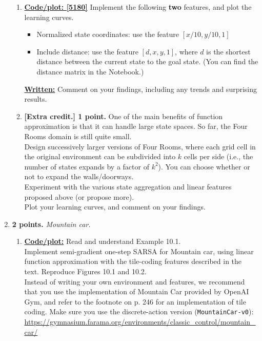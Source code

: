 \documentclass{article}
\begin{document}
\begin{enumerate}
\begin{enumerate}[resume]
\item \uline{\textbf{Code/plot: [5180]}} Implement the following \textbf{two} features, and plot the learning curves. \\
\begin{itemize}
    \item Normalized state coordinates: use the feature $[x/10, y/10, 1]$
    \item Include distance: use the feature $[d, x, y, 1]$, where $d$ is the shortest distance between the current state to the goal state. (You can find the distance matrix in the Notebook.)
\end{itemize}
\uline{\textbf{Written:}} Comment on your findings, including any trends and surprising results. \\


\vspace{20pt}

\item \textbf{[Extra credit.] 1 point.} One of the main benefits of function approximation is that it can handle large state spaces. So far, the Four Rooms domain is still quite small. \\
Design successively larger versions of Four Rooms, where each grid cell in the original environment can be subdivided into $k$ cells per side (i.e., the number of states expands by a factor of $k^2$). You can choose whether or not to expand the walls/doorways. \\
Experiment with the various state aggregation and linear features proposed above (or propose more). \\
Plot your learning curves, and comment on your findings.
\end{enumerate}

\newpage

\item \textbf{2 points.} \textit{Mountain car.}
\begin{enumerate}
\item \uline{\textbf{Code/plot:}} Read and understand Example 10.1. \\
Implement semi-gradient one-step SARSA for Mountain car, using linear function approximation with the tile-coding features described in the text. Reproduce Figures 10.1 and 10.2. \\
Instead of writing your own environment and features, we recommend that you use the implementation of Mountain Car provided by OpenAI Gym, and refer to the footnote on p. 246 for an implementation of tile coding. Make sure you use the discrete-action version (\texttt{MountainCar-v0}): \\
\url{https://gymnasium.farama.org/environments/classic_control/mountain_car/}
\end{enumerate}


\end{enumerate}
\end{document}
